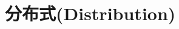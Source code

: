 \documentclass[../../interview-questions.tex]{subfiles}
\begin{document}
\section{分布式(Distribution)}






\end{document}
